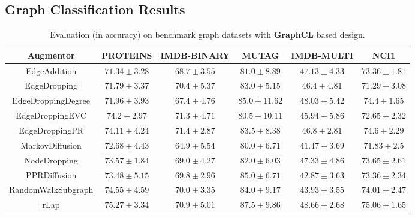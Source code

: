 \documentclass{article}
\theoremstyle{plain}
\theoremstyle{definition}
\theoremstyle{remark}
\begin{document}
\subsection{Graph Classification Results}



\begin{table*}[ht!]
\centering
\caption{Evaluation (in accuracy) on benchmark graph datasets with \textbf{GraphCL} based design.}
\label{table:results_graphcl}
\vskip 0.15in
\begin{center}
\begin{small}
\begin{sc}
\begin{tabular}{c|c|c|c|c|c}
\toprule
Augmentor & PROTEINS & IMDB-BINARY & MUTAG & IMDB-MULTI & NCI1 \\
\midrule
EdgeAddition &  $71.34 \pm 3.28$ & $68.7 \pm 3.55$   &  $81.0 \pm 8.89$  &  $47.13 \pm 4.33$ & $73.36 \pm 1.81$ \\
EdgeDropping & $71.79 \pm 3.37$  & $70.4 \pm 5.37$  &  $83.0 \pm 5.15$ &   $46.4 \pm 4.81$ & $71.29 \pm 3.08$ \\
EdgeDroppingDegree & $71.96 \pm 3.93$ & $67.4 \pm 4.76$ & $85.0 \pm 11.62$ & \underline{$48.03 \pm 5.42$} & $74.4 \pm 1.65$   \\
EdgeDroppingEVC & $74.2 \pm 2.97$ & \underline{$71.3 \pm 4.71$}  & $80.5 \pm 10.11$ &  $45.94 \pm 5.86$ & $72.65 \pm 2.32$  \\
EdgeDroppingPR &  $74.11 \pm 4.24$ & $\mathbf{71.4 \pm 2.87}$  & $83.5 \pm 8.38$ & $46.8 \pm 2.81$ & \underline{$74.6 \pm 2.29$} \\
MarkovDiffusion &  $72.68 \pm 4.43$ &  $64.9 \pm 5.54$ & $80.0 \pm 6.71$ &  $41.47 \pm 3.69$ & $71.83 \pm 2.5$\\
NodeDropping & $73.57 \pm 1.84$  & $69.0 \pm 4.27$  &  $82.0 \pm 6.03$  &  $47.33 \pm 4.86$ &  $73.65 \pm 2.61$\\
PPRDiffusion &  $73.48 \pm 5.15$  & $69.8 \pm 2.96$   & \underline{$85.0 \pm 6.71$}  & $42.87 \pm 3.63$ & $73.36 \pm 2.34$ \\
RandomWalkSubgraph & \underline{$74.55 \pm 4.59$}  &  $70.0 \pm 3.35$ &  $84.0 \pm 9.17$  & $43.93 \pm 3.55$ & $74.01 \pm 2.47$ \\
rLap &  $\mathbf{75.27 \pm 3.34}$ & $70.9 \pm 5.01$  & $\mathbf{87.5 \pm 9.86}$  & $\mathbf{48.66 \pm 2.68}$ & $\mathbf{75.06 \pm 1.65}$  \\
\bottomrule
\end{tabular}
\end{sc}
\end{small}
\end{center}
\vskip -0.1in
\end{table*}
\end{document}
